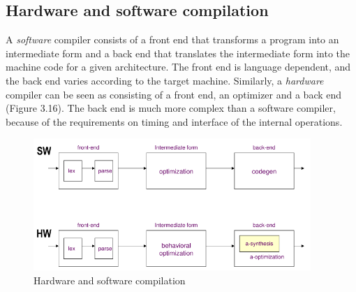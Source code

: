 \subsection{Hardware and software compilation}
A \textit{software} compiler consists of a  front end  that transforms a program into an intermediate form  and a  back end  that translates the intermediate form into the machine code for a given architecture. The front end is language dependent, and the back end varies according to the target machine. Similarly, a \textit{hardware} compiler can be seen as consisting of a front end, an optimizer and a back end (Figure 3.16). The back end is much more complex than a software compiler, because of the requirements on timing and interface of the internal
operations.
\begin{figure}[H]
	 \centering
	 \includegraphics[height=50mm]{./Cap3/Images/Image02.png}
	 \caption[Optional caption]{Hardware and software compilation}
	 \label{fig:comp}
\end{figure}

